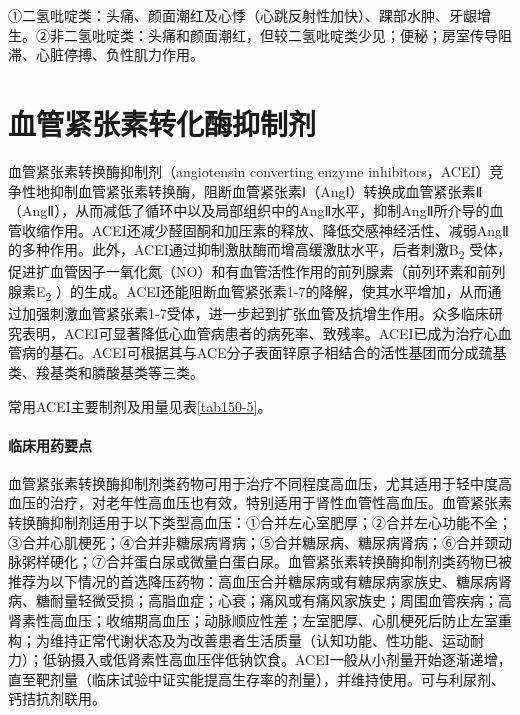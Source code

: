①二氢吡啶类：头痛、颜面潮红及心悸（心跳反射性加快）、踝部水肿、牙龈增生。②非二氢吡啶类：头痛和颜面潮红，但较二氢吡啶类少见；便秘；房室传导阻滞、心脏停搏、负性肌力作用。

\protect\hypertarget{text00411.html}{}{}

\section{血管紧张素转化酶抑制剂}

血管紧张素转换酶抑制剂（angiotensin converting enzyme
inhibitors，ACEI）竞争性地抑制血管紧张素转换酶，阻断血管紧张素Ⅰ（AngⅠ）转换成血管紧张素Ⅱ（AngⅡ），从而减低了循环中以及局部组织中的AngⅡ水平，抑制AngⅡ所介导的血管收缩作用。ACEI还减少醛固酮和加压素的释放、降低交感神经活性、减弱AngⅡ的多种作用。此外，ACEI通过抑制激肽酶而增高缓激肽水平，后者刺激B\textsubscript{2}
受体，促进扩血管因子一氧化氮（NO）和有血管活性作用的前列腺素（前列环素和前列腺素E\textsubscript{2}
）的生成。ACEI还能阻断血管紧张素1-7的降解，使其水平增加，从而通过加强刺激血管紧张素1-7受体，进一步起到扩张血管及抗增生作用。众多临床研究表明，ACEI可显著降低心血管病患者的病死率、致残率。ACEI已成为治疗心血管病的基石。ACEI可根据其与ACE分子表面锌原子相结合的活性基团而分成巯基类、羧基类和膦酸基类等三类。

常用ACEI主要制剂及用量见表\ref{tab150-5}。

\paragraph{临床用药要点}

血管紧张素转换酶抑制剂类药物可用于治疗不同程度高血压，尤其适用于轻中度高血压的治疗，对老年性高血压也有效，特别适用于肾性血管性高血压。血管紧张素转换酶抑制剂适用于以下类型高血压：①合并左心室肥厚；②合并左心功能不全；③合并心肌梗死；④合并非糖尿病肾病；⑤合并糖尿病、糖尿病肾病；⑥合并颈动脉粥样硬化；⑦合并蛋白尿或微量白蛋白尿。血管紧张素转换酶抑制剂类药物已被推荐为以下情况的首选降压药物：高血压合并糖尿病或有糖尿病家族史、糖尿病肾病、糖耐量轻微受损；高脂血症；心衰；痛风或有痛风家族史；周围血管疾病；高肾素性高血压；收缩期高血压；动脉顺应性差；左室肥厚、心肌梗死后防止左室重构；为维持正常代谢状态及为改善患者生活质量（认知功能、性功能、运动耐力）；低钠摄入或低肾素性高血压伴低钠饮食。ACEI一般从小剂量开始逐渐递增，直至靶剂量（临床试验中证实能提高生存率的剂量），并维持使用。可与利尿剂、钙拮抗剂联用。

